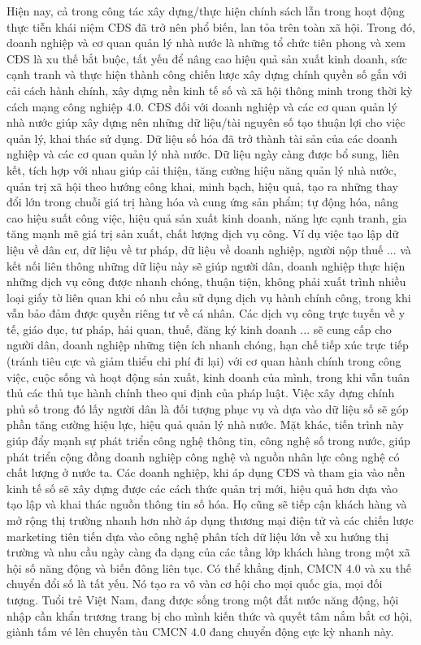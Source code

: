 \begin{multicols}{2}
	\vskip 0.05cm
	Hiện nay, cả trong công tác xây dựng/thực hiện chính sách lẫn trong hoạt động thực tiễn khái niệm CĐS đã trở nên phổ biến, lan tỏa trên toàn xã hội. Trong đó, doanh nghiệp và cơ quan quản lý nhà nước là những tổ chức tiên phong và xem CĐS là xu thế bắt buộc, tất yếu để nâng cao hiệu quả sản xuất kinh doanh, sức cạnh tranh và thực hiện thành công chiến lược xây dựng chính quyền số gắn với cải cách hành chính, xây dựng nền kinh tế số và xã hội thông minh trong thời kỳ cách mạng công nghiệp $4{.}0$.
	\vskip 0.05cm
	CĐS đối với doanh nghiệp và các cơ quan quản lý nhà nước giúp xây dựng nên những dữ liệu/tài nguyên số tạo thuận lợi cho việc quản lý, khai thác sử dụng. Dữ liệu số hóa đã trở thành tài sản của các doanh nghiệp và các cơ quan quản lý nhà nước. Dữ liệu ngày càng được bổ sung, liên kết, tích hợp với nhau giúp cải thiện, tăng cường hiệu năng quản lý nhà nước, quản trị xã hội theo hướng công khai, minh bạch, hiệu quả, tạo ra những thay đổi lớn trong chuỗi giá trị hàng hóa và cung ứng sản phẩm; tự động hóa, nâng cao hiệu suất công việc, hiệu quả sản xuất kinh doanh, năng lực cạnh tranh, gia tăng mạnh mẽ giá trị sản xuất, chất lượng dịch vụ công.
	\vskip 0.05cm
	Ví dụ việc tạo lập dữ liệu về dân cư, dữ liệu về tư pháp, dữ liệu về doanh nghiệp, người nộp thuế ... và kết nối liên thông những dữ liệu này sẽ giúp người dân, doanh nghiệp thực hiện những dịch vụ công được nhanh chóng, thuận tiện, không phải xuất trình nhiều loại giấy tờ liên quan khi có nhu cầu sử dụng dịch vụ hành chính công, trong khi vẫn bảo đảm được quyền riêng tư về cá nhân. Các dịch vụ công trực tuyến về y tế, giáo dục, tư pháp, hải quan, thuế, đăng ký kinh doanh ... sẽ cung cấp cho người dân, doanh nghiệp những tiện ích nhanh chóng, hạn chế tiếp xúc trực tiếp (tránh tiêu cực và giảm thiểu chi phí đi lại) với cơ quan hành chính trong công việc, cuộc sống và hoạt động sản xuất, kinh doanh của mình, trong khi vẫn tuân thủ các thủ tục hành chính theo qui định của pháp luật. Việc xây dựng chính phủ số trong đó lấy người dân là đối tượng phục vụ và dựa vào dữ liệu số sẽ góp phần tăng cường hiệu lực, hiệu quả quản lý nhà nước. Mặt khác, tiến trình này giúp đẩy mạnh sự phát triển công nghệ thông tin, công nghệ số trong nước, giúp phát triển cộng đồng doanh nghiệp công nghệ và nguồn nhân lực công nghệ có chất lượng ở nước ta.
	\vskip 0.05cm
	Các doanh nghiệp, khi áp dụng CĐS và tham gia vào nền kinh tế số sẽ xây dựng được các cách thức quản trị mới, hiệu quả hơn dựa vào tạo lập và khai thác nguồn thông tin số hóa. Họ cũng sẽ tiếp cận khách hàng và mở rộng thị trường nhanh hơn nhờ áp dụng thương mại điện tử và các chiến lược marketing tiên tiến dựa vào công nghệ phân tích dữ liệu lớn về xu hướng thị trường và nhu cầu ngày càng đa dạng của các tầng lớp khách hàng trong một xã hội số năng động và biến đông liên tục.
	\vskip 0.05cm
	Có thể khẳng định, CMCN $4{.}0$ và xu thế chuyển đổi số là tất yếu. Nó tạo ra vô vàn cơ hội cho mọi quốc gia, mọi đối tượng. Tuổi trẻ Việt Nam, đang được sống trong một đất nước năng động, hội nhập cần khẩn trương trang bị cho mình kiến thức và quyết tâm nắm bắt cơ hội, giành tấm vé lên chuyến tàu CMCN $4{.}0$ đang chuyển động cực kỳ nhanh này.
\end{multicols}

